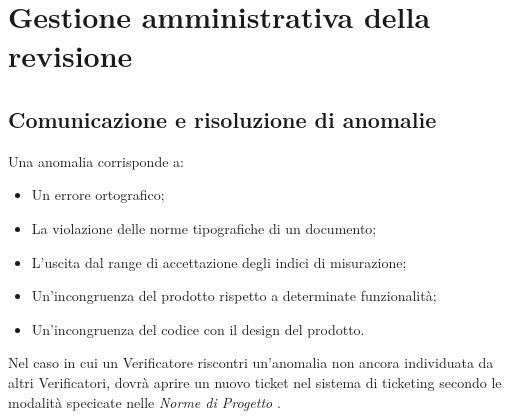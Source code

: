 \section{Gestione amministrativa della revisione}
\subsection{Comunicazione e risoluzione di anomalie}
  Una anomalia corrisponde a:
  \begin{itemize}
    \item Un errore ortografico;
    \item La violazione delle norme tipografiche di un documento;
    \item L'uscita dal range di accettazione degli indici di misurazione;
    \item Un'incongruenza del prodotto rispetto a determinate funzionalità;
    \item Un'incongruenza del codice con il design del prodotto.
  \end{itemize}
  Nel caso in cui un Verificatore riscontri un'anomalia non ancora individuata da
  altri Verificatori, dovrà aprire un nuovo ticket nel sistema di ticketing secondo
  le modalità specicate nelle \emph{Norme di Progetto \VersioneNP{}}.
